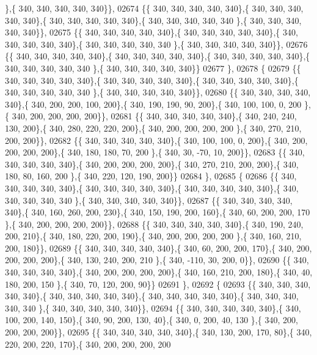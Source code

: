 \begin{DoxyCode}
      \},\{ 340, 340, 340, 340, 340\}\},
02674 \{\{ 340, 340, 340, 340, 340\},\{ 340, 340, 340, 340, 340\},\{ 340, 340, 340, 340, 340\},\{ 340, 340, 340, 340, 340
      \},\{ 340, 340, 340, 340, 340\}\},
02675 \{\{ 340, 340, 340, 340, 340\},\{ 340, 340, 340, 340, 340\},\{ 340, 340, 340, 340, 340\},\{ 340, 340, 340, 340, 340
      \},\{ 340, 340, 340, 340, 340\}\},
02676 \{\{ 340, 340, 340, 340, 340\},\{ 340, 340, 340, 340, 340\},\{ 340, 340, 340, 340, 340\},\{ 340, 340, 340, 340, 340
      \},\{ 340, 340, 340, 340, 340\}\}
02677 \},
02678 \{
02679 \{\{ 340, 340, 340, 340, 340\},\{ 340, 340, 340, 340, 340\},\{ 340, 340, 340, 340, 340\},\{ 340, 340, 340, 340, 340
      \},\{ 340, 340, 340, 340, 340\}\},
02680 \{\{ 340, 340, 340, 340, 340\},\{ 340, 200, 200, 100, 200\},\{ 340, 190, 190,  90, 200\},\{ 340, 100, 100,   0, 200
      \},\{ 340, 200, 200, 200, 200\}\},
02681 \{\{ 340, 340, 340, 340, 340\},\{ 340, 240, 240, 130, 200\},\{ 340, 280, 220, 220, 200\},\{ 340, 200, 200, 200, 200
      \},\{ 340, 270, 210, 200, 200\}\},
02682 \{\{ 340, 340, 340, 340, 340\},\{ 340, 100, 100,   0, 200\},\{ 340, 200, 200, 200, 200\},\{ 340, 180, 180,  70, 200
      \},\{ 340,  30, -70,  10, 200\}\},
02683 \{\{ 340, 340, 340, 340, 340\},\{ 340, 200, 200, 200, 200\},\{ 340, 270, 210, 200, 200\},\{ 340, 180,  80, 160, 200
      \},\{ 340, 220, 120, 190, 200\}\}
02684 \},
02685 \{
02686 \{\{ 340, 340, 340, 340, 340\},\{ 340, 340, 340, 340, 340\},\{ 340, 340, 340, 340, 340\},\{ 340, 340, 340, 340, 340
      \},\{ 340, 340, 340, 340, 340\}\},
02687 \{\{ 340, 340, 340, 340, 340\},\{ 340, 160, 260, 200, 230\},\{ 340, 150, 190, 200, 160\},\{ 340,  60, 200, 200, 170
      \},\{ 340, 200, 200, 200, 200\}\},
02688 \{\{ 340, 340, 340, 340, 340\},\{ 340, 190, 240, 200, 210\},\{ 340, 180, 220, 200, 190\},\{ 340, 200, 200, 200, 200
      \},\{ 340, 160, 210, 200, 180\}\},
02689 \{\{ 340, 340, 340, 340, 340\},\{ 340,  60, 200, 200, 170\},\{ 340, 200, 200, 200, 200\},\{ 340, 130, 240, 200, 210
      \},\{ 340, -110,  30, 200,   0\}\},
02690 \{\{ 340, 340, 340, 340, 340\},\{ 340, 200, 200, 200, 200\},\{ 340, 160, 210, 200, 180\},\{ 340,  40, 180, 200, 150
      \},\{ 340,  70, 120, 200,  90\}\}
02691 \},
02692 \{
02693 \{\{ 340, 340, 340, 340, 340\},\{ 340, 340, 340, 340, 340\},\{ 340, 340, 340, 340, 340\},\{ 340, 340, 340, 340, 340
      \},\{ 340, 340, 340, 340, 340\}\},
02694 \{\{ 340, 340, 340, 340, 340\},\{ 340, 100, 200, 140, 150\},\{ 340,  90, 200, 130,  40\},\{ 340,   0, 200,  40, 130
      \},\{ 340, 200, 200, 200, 200\}\},
02695 \{\{ 340, 340, 340, 340, 340\},\{ 340, 130, 200, 170,  80\},\{ 340, 220, 200, 220, 170\},\{ 340, 200, 200, 200, 200

\end{DoxyCode}

